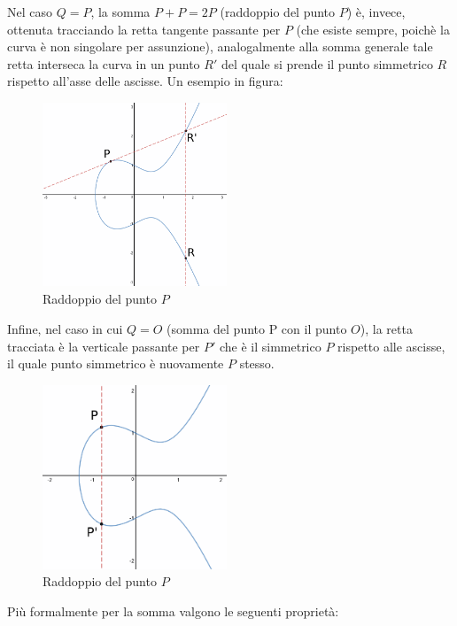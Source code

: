\documentclass{article}
\begin{document}
	Nel caso $Q = P$, la somma $P+P = 2P$ (raddoppio del punto $P$) è, invece, ottenuta tracciando la retta tangente passante per $P$ (che esiste sempre, poichè la curva è non singolare per assunzione), analogalmente alla somma generale tale retta interseca la curva in un punto $R'$ del quale si prende il punto simmetrico $R$ rispetto all'asse delle ascisse. Un esempio in figura:\\
	
	\begin{figure}[H]
		\centering
		
		\includegraphics[width=5.5cm, height=5.5cm]{img/img4}
		
		\caption{Raddoppio del punto $P$}
		\label{fig:fig4}
	\end{figure}%
	
	
	Infine, nel caso in cui $Q = O$ (somma del punto P con il punto $O$), la retta tracciata è la verticale passante per $P'$ che è il simmetrico $P$ rispetto alle ascisse, il quale punto simmetrico è nuovamente $P$ stesso.\\
	
	\begin{figure}[H]
		\centering
		
		\includegraphics[width=5.5cm, height=5.5cm]{img/img5}
		
		\caption{Raddoppio del punto $P$}
		\label{fig:fig5}
	\end{figure}%
	
	Più formalmente per la somma valgono le seguenti proprietà:
	
\end{document}

